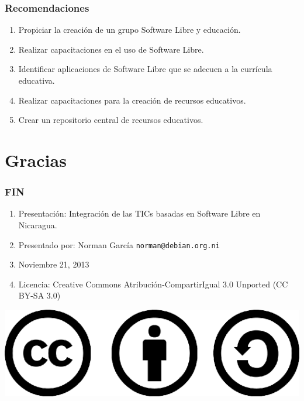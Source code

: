 \documentclass{beamer}
\begin{document}
\begin{frame} 
\frametitle{Recomendaciones}
	\begin{enumerate}
		\pause \item Propiciar la creaci\'on de un grupo Software Libre y educaci\'on.
		\pause \item Realizar capacitaciones en el uso de Software Libre.
		\pause \item Identificar aplicaciones de Software Libre que se adecuen a la curr\'icula educativa.
		\pause \item Realizar capacitaciones para la creaci\'on de recursos educativos.
		\pause \item Crear un repositorio central de recursos educativos.
	\end{enumerate}
\end{frame}


\section{Gracias}


\begin{frame}
\frametitle{FIN}
	\begin{enumerate}
		\pause \item Presentaci\'on: Integraci\'on de las TICs basadas en Software Libre en Nicaragua.
		\pause \item Presentado por: Norman Garc\'ia  \texttt{norman@debian.org.ni}
		\pause \item Noviembre 21, 2013
		\pause \item Licencia: Creative Commons Atribuci\'on-CompartirIgual 3.0 Unported (CC BY-SA 3.0)
	\end{enumerate}

	\begin{center}
  		 \includegraphics[scale=0.20]{../img/cclogo.png}
	\end{center}

\end{frame}
\end{document}
